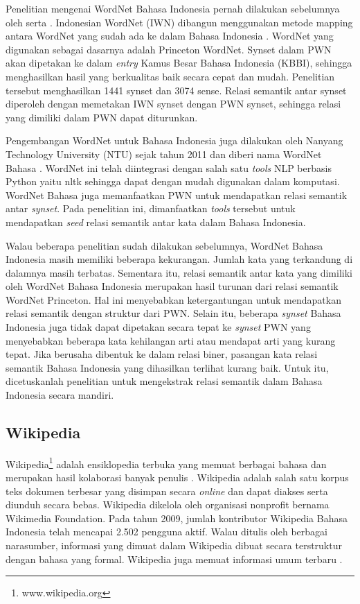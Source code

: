 Penelitian mengenai WordNet Bahasa Indonesia pernah dilakukan sebelumnya oleh \cite{putra2008building} serta \cite{margaretha2008comparing}. Indonesian WordNet (IWN) dibangun menggunakan metode mapping antara WordNet yang sudah ada ke dalam Bahasa Indonesia \citep{putra2008building}. WordNet yang digunakan sebagai dasarnya adalah Princeton WordNet. Synset dalam PWN akan dipetakan ke dalam \textit{entry} Kamus Besar Bahasa Indonesia (KBBI), sehingga menghasilkan hasil yang berkualitas baik secara cepat dan mudah. Penelitian tersebut menghasilkan 1441 synset dan 3074 sense. Relasi semantik antar synset diperoleh dengan memetakan IWN synset dengan PWN synset, sehingga relasi yang dimiliki dalam PWN dapat diturunkan.

Pengembangan WordNet untuk Bahasa Indonesia juga dilakukan oleh Nanyang Technology University (NTU) sejak tahun 2011 dan diberi nama WordNet Bahasa \citep{noor2011creating}. WordNet ini telah diintegrasi dengan salah satu \textit{tools} NLP berbasis Python yaitu nltk sehingga dapat dengan mudah digunakan dalam komputasi. WordNet Bahasa juga memanfaatkan PWN untuk mendapatkan relasi semantik antar \textit{synset}. Pada penelitian ini, dimanfaatkan \textit{tools} tersebut untuk mendapatkan \textit{seed} relasi semantik antar kata dalam Bahasa Indonesia.

Walau beberapa penelitian sudah dilakukan sebelumnya, WordNet Bahasa Indonesia masih memiliki beberapa kekurangan. Jumlah kata yang terkandung di dalamnya masih terbatas. Sementara itu, relasi semantik antar kata yang dimiliki oleh WordNet Bahasa Indonesia merupakan hasil turunan dari relasi semantik WordNet Princeton. Hal ini menyebabkan ketergantungan untuk mendapatkan relasi semantik dengan struktur dari PWN. Selain itu, beberapa \textit{synset} Bahasa Indonesia juga tidak dapat dipetakan secara tepat ke \textit{synset} PWN yang menyebabkan beberapa kata kehilangan arti atau mendapat arti yang kurang tepat. Jika berusaha dibentuk ke dalam relasi biner, pasangan kata relasi semantik Bahasa Indonesia yang dihasilkan terlihat kurang baik. Untuk itu, dicetuskanlah penelitian untuk mengekstrak relasi semantik dalam Bahasa Indonesia secara mandiri. 

\subsection{Wikipedia}
Wikipedia\footnote{www.wikipedia.org} adalah ensiklopedia terbuka yang memuat berbagai bahasa dan merupakan hasil kolaborasi banyak penulis \citep{denoyer2006wikipedia}. Wikipedia adalah salah satu korpus teks dokumen terbesar yang disimpan secara \textit{online} dan dapat diakses serta diunduh secara bebas. Wikipedia dikelola oleh organisasi nonprofit bernama Wikimedia Foundation. Pada tahun 2009, jumlah kontributor Wikipedia Bahasa Indonesia telah mencapai 2.502 pengguna aktif. Walau ditulis oleh berbagai narasumber, informasi yang dimuat dalam Wikipedia dibuat secara terstruktur dengan bahasa yang formal. Wikipedia juga memuat informasi umum terbaru \citep{arnold2014extracting}.

